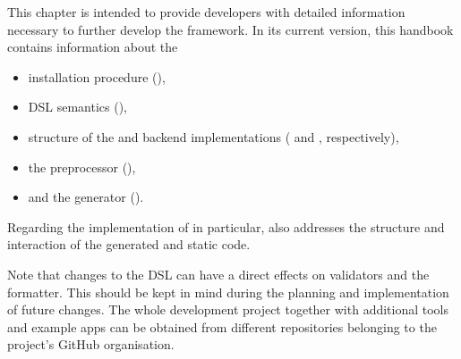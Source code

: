 
This chapter is intended to provide \MD developers with detailed information necessary to further develop the framework.
In its current version, this handbook contains information about the

\begin{itemize}
	\item installation procedure (),
	\item DSL semantics (),
	\item structure of the \mapapps and backend implementations ( and , respectively),
	\item the preprocessor (),
	\item and the \mapapps generator ().
\end{itemize}

Regarding the implementation of \mapapps in particular,  also addresses the structure and interaction of the generated and static code.

Note that changes to the DSL can have a direct effects on validators and the formatter.
This should be kept in mind during the planning and implementation of future changes. The whole development project together with additional tools and example apps can be obtained from different repositories belonging to the project's GitHub organisation.
